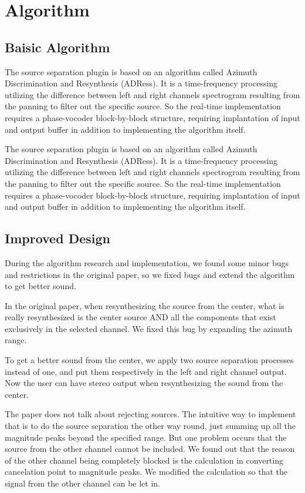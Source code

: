 \documentclass{sig-alternate}
\begin{document}
\section{Algorithm}\label{sec:algorithm_desc}

\subsection{Baisic Algorithm}

The source separation plugin is based on an algorithm called Azimuth Discrimination and Resynthesis (ADRess). It is a time-frequency processing utilizing the difference between left and right channels spectrogram resulting from the panning to filter out the specific source. So the real-time implementation requires a phase-vocoder block-by-block structure, requiring implantation of input and output buffer in addition to implementing the algorithm itself.
   
The source separation plugin is based on an algorithm called Azimuth Discrimination and Resynthesis (ADRess). It is a time-frequency processing utilizing the difference between left and right channels spectrogram resulting from the panning to filter out the specific source. So the real-time implementation requires a phase-vocoder block-by-block structure, requiring implantation of input and output buffer in addition to implementing the algorithm itself.


\subsection{Improved Design}

During the algorithm research and implementation, we found some minor bugs and restrictions in the original paper, so we fixed bugs and extend the algorithm to get better sound.
    
In the original paper, when resynthesizing the source from the center, what is really resynthesized is the center source AND all the components that exist exclusively in the selected channel. We fixed this bug by expanding the azimuth range.

To get a better sound from the center, we apply two source separation processes instead of one, and put them respectively in the left and right channel output. Now the user can have stereo output when resynthesizing the sound from the center.

The paper does not talk about rejecting sources. The intuitive way to implement that is to do the source separation the other way round, just summing up all the magnitude peaks beyond the specified range. But one problem occurs that the source from the other channel cannot be included. We found out that the reason of the other channel being completely blocked is the calculation in converting cancelation point to magnitude peaks. We modified the calculation so that the signal from the other channel can be let in.
\end{document}
